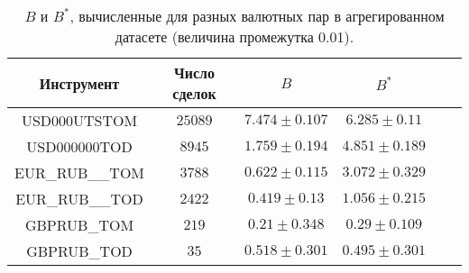 \begin{table}[h!]
    \begin{center}
        \begin{tabular}{|c|c|c|c|c|c|}
            \hline
            Инструмент      & Число сделок & $B$               & $B ^*$            \\ \hline
            USD000UTSTOM    & $25089$      & $7.474 \pm 0.107$ & $6.285 \pm 0.11$  \\ \hline
            USD000000TOD    & $8945$       & $1.759 \pm 0.194$ & $4.851 \pm 0.189$ \\ \hline
            EUR\_RUB\_\_TOM & $3788$       & $0.622 \pm 0.115$ & $3.072 \pm 0.329$ \\ \hline
            EUR\_RUB\_\_TOD & $2422$       & $0.419 \pm 0.13$  & $1.056 \pm 0.215$ \\ \hline
            GBPRUB\_TOM     & $219$        & $0.21 \pm 0.348$  & $0.29 \pm 0.109$  \\ \hline
            GBPRUB\_TOD     & $35$         & $0.518 \pm 0.301$ & $0.495 \pm 0.301$ \\ \hline

        \end{tabular}
    \end{center}
    \caption{$B$ и $B ^*$, вычисленные для разных валютных пар в агрегированном датасете (величина промежутка 0.01).}
    \label{Aggreg1CU}
\end{table}

